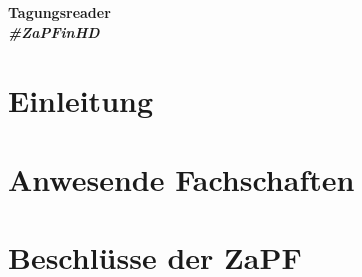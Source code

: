 \documentclass[ngerman, twoside, 10pt, openany, a5paper]{scrbook}
\begin{document}
  \pagestyle{empty}

  \vspace*{2cm}

  {\noindent\hspace*{\dimexpr-\oddsidemargin-1in\relax}\colorbox{unicolor}{}\hspace*{-\paperwidth}}

  \centering
  \vspace{3cm}
  \Huge \textbf{Tagungsreader} \\
  \vspace*{1.5cm}
  \Huge \textbf{\textit{\#ZaPFinHD}}
  \newpage


\newpage
\setcounter{tocdepth}{1} %
\normalsize

\dominitoc
\tableofcontents
\thispagestyle{empty}

\emptychapter

\chapter{Einleitung}
  

\chapter{Anwesende Fachschaften}
  

\tocchapter

\chapter{Beschlüsse der ZaPF}
  \label{chap:reso}
\end{document}
